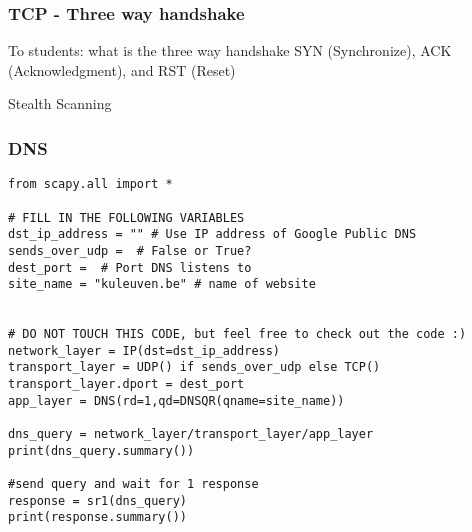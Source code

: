 \documentclass[11pt,a4paper]{article}
\begin{document}
\subsubsection{TCP - Three way handshake}

To students: what is the three way handshake
SYN (Synchronize), ACK (Acknowledgment), and RST (Reset)

Stealth Scanning




\subsubsection{DNS}
\begin{verbatim}
from scapy.all import * 

# FILL IN THE FOLLOWING VARIABLES
dst_ip_address = "" # Use IP address of Google Public DNS
sends_over_udp =  # False or True?
dest_port =  # Port DNS listens to
site_name = "kuleuven.be" # name of website


# DO NOT TOUCH THIS CODE, but feel free to check out the code :)
network_layer = IP(dst=dst_ip_address)
transport_layer = UDP() if sends_over_udp else TCP()
transport_layer.dport = dest_port
app_layer = DNS(rd=1,qd=DNSQR(qname=site_name))

dns_query = network_layer/transport_layer/app_layer
print(dns_query.summary())

#send query and wait for 1 response
response = sr1(dns_query)
print(response.summary())
\end{verbatim}
\end{document}
